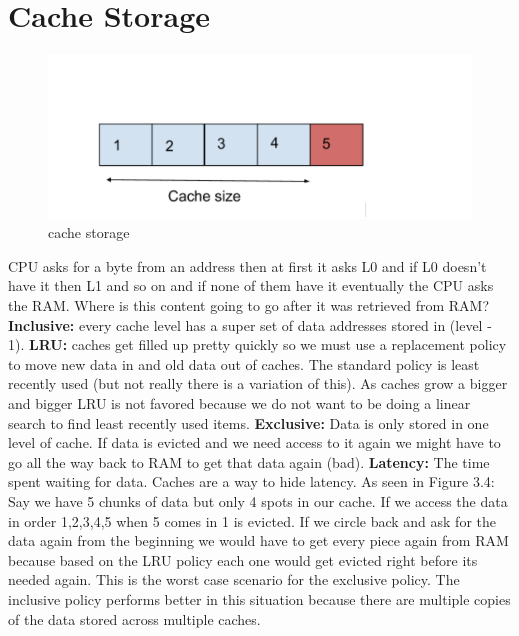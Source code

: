 \documentclass[twoside]{article}
\begin{document}
\section{Cache Storage}
\begin{figure}[h!]
  \includegraphics[width=\linewidth]{fig4.png}
  \caption{cache storage}
  \label{fig:fig4}
\end{figure}
CPU asks for a byte from an address then at first it asks L0 and if L0 doesn't have it then L1 and so on and if none of them have it eventually the CPU asks the RAM. Where is this content going to go after it was retrieved from RAM?
\newline
\textbf{Inclusive:} every cache level has a super set of data addresses stored in (level - 1). 
\newline
\textbf{LRU:} caches get filled up pretty quickly so we must use a replacement policy to move new data in and old data out of caches. The standard policy is least recently used (but not really there is a variation of this). As caches grow a bigger and bigger LRU is not favored because we do not want to be doing a linear search to find least recently used items.
\newline
\textbf{Exclusive:} Data is only stored in one level of cache. If data is evicted and we need access to it again we might have to go all the way back to RAM to get that data again (bad). 
\newline
\textbf{Latency:} The time spent waiting for data. Caches are a way to hide latency. 
\newline\newline
As seen in Figure 3.4: Say we have 5 chunks of data but only 4 spots in our cache. If we access the data in order 1,2,3,4,5 when 5 comes in 1 is evicted. If we circle back and ask for the data again from the beginning we would have to get every piece again from RAM because based on the LRU policy each one would get evicted right before its needed again. This is the worst case scenario for the exclusive policy. The inclusive policy performs better in this situation because there are multiple copies of the data stored across multiple caches.
\end{document}
